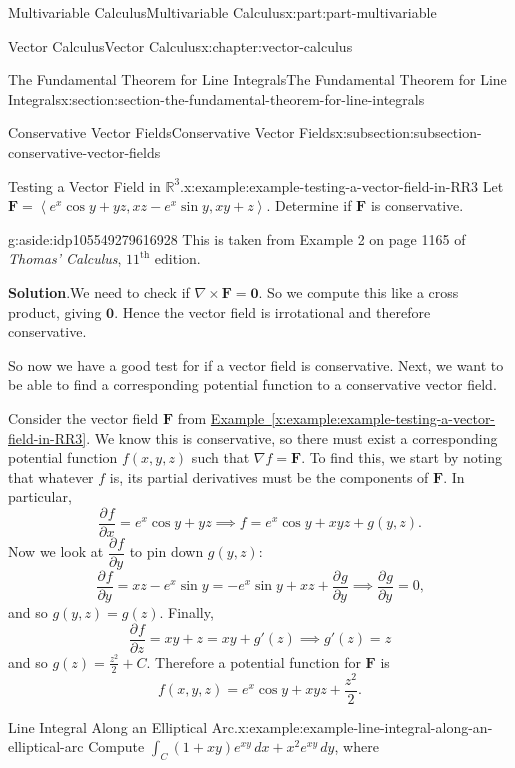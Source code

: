 \documentclass[twoside,10pt,]{book}
\newcommand{\blocktitlefont}{\relax}
\newcommand{\xreffont}{\relax}
\numberwithin{equation}{part}
\newcommand{\RR}{\mathbb{R}}
\newcommand{\grad}{\nabla}
\newcommand{\curl}{\nabla\times}
\newcommand{\vb}[1]{\mathbf{#1}}
\newcommand{\pdv}[3][]{\dfrac{\partial^{#1} #2}{\partial #3^{#1}}}
\newcommand{\dotprod}[1]{\left\langle #1 \right\rangle}
\begin{document}
\begin{partptx}{Multivariable Calculus}{}{Multivariable Calculus}{}{}{x:part:part-multivariable}
\begin{chapterptx}{Vector Calculus}{}{Vector Calculus}{}{}{x:chapter:vector-calculus}
\begin{sectionptx}{The Fundamental Theorem for Line Integrals}{}{The Fundamental Theorem for Line Integrals}{}{}{x:section:section-the-fundamental-theorem-for-line-integrals}
\begin{subsectionptx}{Conservative Vector Fields}{}{Conservative Vector Fields}{}{}{x:subsection:subsection-conservative-vector-fields}
\begin{example}{Testing a Vector Field in \(\RR^{3}\).}{x:example:example-testing-a-vector-field-in-RR3}%
Let \(\vb{F} = \dotprod{e^{x}\cos y + yz, xz - e^{x}\sin y, xy + z}\). Determine if \(\vb{F}\) is conservative.%
\begin{aside}{}{g:aside:idp105549279616928}%
This is taken from Example 2 on page 1165 of \emph{Thomas' Calculus}, \(11^{\text{th}}\) edition.%
\end{aside}
\par\smallskip%
\noindent\textbf{\blocktitlefont Solution}.\hypertarget{g:solution:idp105549279618080}{}\quad{}We need to check if \(\curl\vb{F} = \vb{0}\). So we compute this like a cross product, giving \(\vb{0}\). Hence the vector field is irrotational and therefore conservative.%
\end{example}
So now we have a good test for if a vector field is conservative. Next, we want to be able to find a corresponding potential function to a conservative vector field.%
\par
Consider the vector field \(\vb{F}\) from \hyperref[x:example:example-testing-a-vector-field-in-RR3]{Example~{\xreffont\ref{x:example:example-testing-a-vector-field-in-RR3}}}. We know this is conservative, so there must exist a corresponding potential function \(f(x,y,z)\) such that \(\grad f = \vb{F}\). To find this, we start by noting that whatever \(f\) is, its partial derivatives must be the components of \(\vb{F}\). In particular,%
\begin{equation*}
\pdv{f}{x} = e^{x}\cos y + yz \implies f = e^{x}\cos y + xyz + g(y,z)\text{.}
\end{equation*}
Now we look at \(\pdv{f}{y}\) to pin down \(g(y,z)\):%
\begin{equation*}
\pdv{f}{y} = xz - e^{x}\sin y = -e^{x}\sin y + xz + \pdv{g}{y} \implies \pdv{g}{y} = 0\text{,}
\end{equation*}
and so \(g(y,z) = g(z)\). Finally,%
\begin{equation*}
\pdv{f}{z} = xy + z = xy + g'(z) \implies g'(z) = z
\end{equation*}
and so \(g(z) = \frac{z^{2}}{2} + C\). Therefore a potential function for \(\vb{F}\) is%
\begin{equation*}
f(x,y,z) = e^{x}\cos y + xyz + \frac{z^{2}}{2}\text{.}
\end{equation*}
%
\begin{example}{Line Integral Along an Elliptical Arc.}{x:example:example-line-integral-along-an-elliptical-arc}%
Compute \(\int_{C}(1 + xy)e^{xy}\,dx + x^{2}e^{xy}\,dy\), where%

\end{example}
\end{subsectionptx}
\end{sectionptx}
\end{chapterptx}
\end{partptx}
\end{document}
